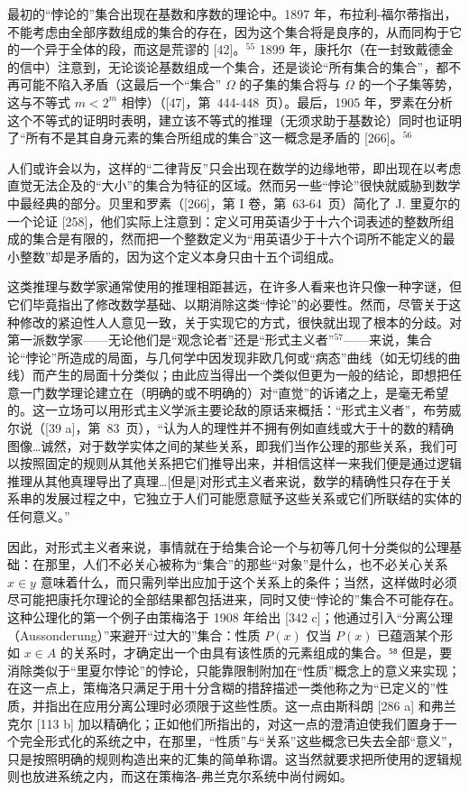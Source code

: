 最初的“悖论的”集合出现在基数和序数的理论中。1897 年，布拉利-福尔蒂指出，不能考虑由全部序数组成的集合的存在，因为这个集合将是良序的，从而同构于它的一个异于全体的段，而这是荒谬的 {[}42{]}。\(^{55}\) 1899 年，康托尔（在一封致戴德金的信中）注意到，无论谈论基数组成一个集合，还是谈论“所有集合的集合”，都不再可能不陷入矛盾（这最后一个“集合” \(\Omega\) 的子集的集合将与 \(\Omega\) 的一个子集等势，这与不等式 \(m < 2^{m}\) 相悖）（{[}47{]}，第~444-448~页）。最后，1905 年，罗素在分析这个不等式的证明时表明，建立该不等式的推理（无须求助于基数论）同时也证明了“所有不是其自身元素的集合所组成的集合”这一概念是矛盾的 {[}266{]}。\(^{56}\)

人们或许会以为，这样的“二律背反”只会出现在数学的边缘地带，即出现在以考虑直觉无法企及的“大小”的集合为特征的区域。然而另一些“悖论”很快就威胁到数学中最经典的部分。贝里和罗素（{[}266{]}，第 I 卷，第~63-64~页）简化了 J. 里夏尔的一个论证 {[}258{]}，他们实际上注意到：定义可用英语少于十六个词表述的整数所组成的集合是有限的，然而把一个整数定义为“用英语少于十六个词所不能定义的最小整数”却是矛盾的，因为这个定义本身只由十五个词组成。

这类推理与数学家通常使用的推理相距甚远，在许多人看来也许只像一种字谜，但它们毕竟指出了修改数学基础、以期消除这类“悖论”的必要性。然而，尽管关于这种修改的紧迫性人人意见一致，关于实现它的方式，很快就出现了根本的分歧。对第一派数学家——无论他们是“观念论者”还是“形式主义者”\(^{57}\)——来说，集合论“悖论”所造成的局面，与几何学中因发现非欧几何或“病态”曲线（如无切线的曲线）而产生的局面十分类似；由此应当得出一个类似但更为一般的结论，即想把任意一门数学理论建立在（明确的或不明确的）对“直觉”的诉诸之上，是毫无希望的。这一立场可以用形式主义学派主要论敌的原话来概括：“形式主义者”，布劳威尔说（{[}39 a{]}，第~83~页），“认为人的理性并不拥有例如直线或大于十的数的精确图像\ldots 诚然，对于数学实体之间的某些关系，即我们当作公理的那些关系，我们可以按照固定的规则从其他关系把它们推导出来，并相信这样一来我们便是通过逻辑推理从其他真理导出了真理\ldots{[}但是{]}对形式主义者来说，数学的精确性只存在于关系串的发展过程之中，它独立于人们可能愿意赋予这些关系或它们所联结的实体的任何意义。”

因此，对形式主义者来说，事情就在于给集合论一个与初等几何十分类似的公理基础：在那里，人们不必关心被称为“集合”的那些“对象”是什么，也不必关心关系 \(x \in y\) 意味着什么，而只需列举出应加于这个关系上的条件；当然，这样做时必须尽可能把康托尔理论的全部结果都包括进来，同时又使“悖论的”集合不可能存在。这种公理化的第一个例子由策梅洛于 1908 年给出 {[}342 c{]}；他通过引入“分离公理（Aussonderung）”来避开“过大的”集合：性质 \(P(x)\) 仅当 \(P(x)\) 已蕴涵某个形如 \(x \in A\) 的关系时，才确定出一个由具有该性质的元素组成的集合。⁵⁸ 但是，要消除类似于“里夏尔悖论”的悖论，只能靠限制附加在“性质”概念上的意义来实现；在这一点上，策梅洛只满足于用十分含糊的措辞描述一类他称之为“已定义的”性质，并指出在应用分离公理时必须限于这些性质。这一点由斯科朗 {[}286 a{]} 和弗兰克尔 {[}113 b{]} 加以精确化；正如他们所指出的，对这一点的澄清迫使我们置身于一个完全形式化的系统之中，在那里，“性质”与“关系”这些概念已失去全部“意义”，只是按照明确的规则构造出来的汇集的简单称谓。这当然就要求把所使用的逻辑规则也放进系统之内，而这在策梅洛-弗兰克尔系统中尚付阙如。

